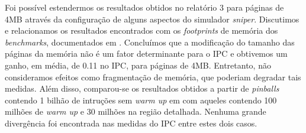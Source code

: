 \documentclass[12pt]{article}
\begin{document}
Foi possível estendermos os resultados obtidos no relatório 3 \cite{relatorio3}
para páginas de 4MB através da configuração de alguns aspectos do simulador
\textit{sniper}. Discutimos e relacionamos os resultados encontrados com os
\textit{footprints} de memória dos \textit{benchmarks}, documentados em
\cite{Henning:07}. Concluímos que a modificação do tamanho das páginas da
memória não é um fator determinante para o IPC e obtivemos um ganho, em média,
de 0.11 no IPC, para páginas de 4MB. Entretanto, não consideramos efeitos como
fragmentação de memória, que poderiam degradar tais medidas. Além disso,
comparou-se os resultados obtidos a partir de \textit{pinballs} contendo 1
bilhão de intruções sem \textit{warm up} em \cite{relatorio3} com aqueles
contendo 100 milhões de \textit{warm up} e 30 milhões na região detalhada.
Nenhuma grande divergência foi encontrada nas medidas do IPC entre estes dois
casos.



\end{document}
